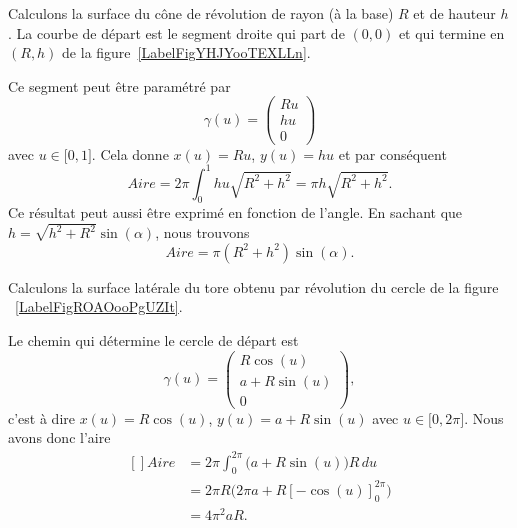 \begin{example}     \label{EXooZCLXooVmXQgY}
    Calculons la surface du cône de révolution de rayon (à la base) $R$ et de hauteur $h$. La courbe de départ est le segment droite qui part de $(0,0)$ et qui termine en $(R,h)$ de la figure~\ref{LabelFigYHJYooTEXLLn}. %
\newcommand{\CaptionFigYHJYooTEXLLn}{En faisant tourner cette droite autour de l'axe $X$, nous obtenons un cône.}


    Ce segment peut être paramétré par
    \begin{equation}
        \gamma(u)=\begin{pmatrix}
            Ru    \\
            hu    \\
            0
        \end{pmatrix}
    \end{equation}
    avec $u\in\mathopen[ 0 , 1 \mathclose]$. Cela donne $x(u)=Ru$, $y(u)=hu$ et par conséquent
    \begin{equation}
        Aire=2\pi\int_0^1hu\sqrt{R^2+h^2}=\pi h\sqrt{R^2+h^2}.
    \end{equation}
    Ce résultat peut aussi être exprimé en fonction de l'angle. En sachant que $h=\sqrt{h^2+R^2}\sin(\alpha)$, nous trouvons
    \begin{equation}
        Aire=\pi(R^2+h^2)\sin(\alpha).
    \end{equation}

\end{example}

\begin{example}
    Calculons la surface latérale du tore obtenu par révolution du cercle de la figure ~\ref{LabelFigROAOooPgUZIt}. %
\newcommand{\CaptionFigROAOooPgUZIt}{Si nous tournons ce cercle autour de l'axe $X$, nous obtenons un tore de rayon «externe» $a$ et de rayon «interne» $R$.}


    Le chemin qui détermine le cercle de départ est
    \begin{equation}
        \gamma(u)=\begin{pmatrix}
            R\cos(u)    \\
            a+R\sin(u)    \\
            0
        \end{pmatrix},
    \end{equation}
    c'est à dire $x(u)=R\cos(u)$, $y(u)=a+R\sin(u)$ avec $u\in\mathopen[ 0 , 2\pi \mathclose]$. Nous avons donc l'aire
    \begin{equation}
        \begin{aligned}[]
            Aire&=2\pi\int_0^{2\pi}\big( a+R\sin(u) \big)R\,du\\
            &=2\pi R\big( 2\pi a+R[-\cos(u)]_0^{2\pi} \big)\\
            &=4\pi^2aR.
        \end{aligned}
    \end{equation}
\end{example}

